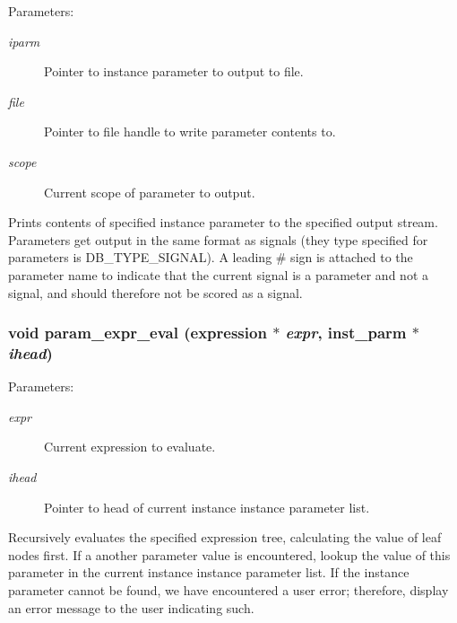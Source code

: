 \begin{Desc}
\item[Parameters: ]\par
\begin{description}
\item[{\em 
iparm}]Pointer to instance parameter to output to file. \item[{\em 
file}]Pointer to file handle to write parameter contents to. \item[{\em 
scope}]Current scope of parameter to output.\end{description}
\end{Desc}
Prints contents of specified instance parameter to the specified output stream. Parameters get output in the same format as signals (they type specified for parameters is DB\_\-TYPE\_\-SIGNAL). A leading \# sign is attached to the parameter name to indicate that the current signal is a parameter and not a signal, and should therefore not be scored as a signal. 
\subsubsection{\setlength{\rightskip}{0pt plus 5cm}void param\_\-expr\_\-eval ({\bf expression} $\ast$ {\em expr}, {\bf inst\_\-parm} $\ast$ {\em ihead})}\label{param_8c_a12}


\begin{Desc}
\item[Parameters: ]\par
\begin{description}
\item[{\em 
expr}]Current expression to evaluate. \item[{\em 
ihead}]Pointer to head of current instance instance parameter list.\end{description}
\end{Desc}
Recursively evaluates the specified expression tree, calculating the value of leaf nodes first. If a another parameter value is encountered, lookup the value of this parameter in the current instance instance parameter list. If the instance parameter cannot be found, we have encountered a user error; therefore, display an error message to the user indicating such. 
